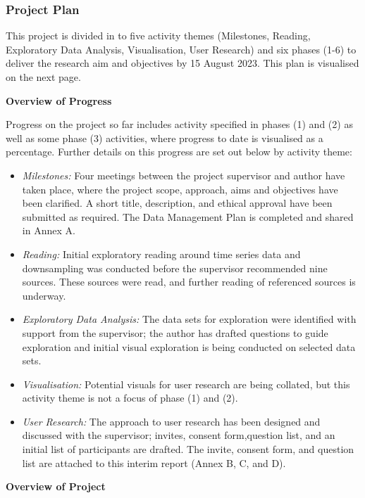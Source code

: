 \documentclass[
]{article}
\begin{document}
\hypertarget{project-plan}{%
\subsubsection{Project Plan}\label{project-plan}}

This project is divided in to five activity themes (Milestones, Reading,
Exploratory Data Analysis, Visualisation, User Research) and six phases
(1-6) to deliver the research aim and objectives by 15 August 2023. This
plan is visualised on the next page.

\textbf{Overview of Progress}

Progress on the project so far includes activity specified in phases (1)
and (2) as well as some phase (3) activities, where progress to date is
visualised as a percentage. Further details on this progress are set out
below by activity theme:

\begin{itemize}
\item
  \emph{Milestones:} Four meetings between the project supervisor and
  author have taken place, where the project scope, approach, aims and
  objectives have been clarified. A short title, description, and
  ethical approval have been submitted as required. The Data Management
  Plan is completed and shared in Annex A.
\item
  \emph{Reading:} Initial exploratory reading around time series data
  and downsampling was conducted before the supervisor recommended nine
  sources. These sources were read, and further reading of referenced
  sources is underway.
\item
  \emph{Exploratory Data Analysis:} The data sets for exploration were
  identified with support from the supervisor; the author has drafted
  questions to guide exploration and initial visual exploration is being
  conducted on selected data sets.
\item
  \emph{Visualisation:} Potential visuals for user research are being
  collated, but this activity theme is not a focus of phase (1) and (2).
\item
  \emph{User Research:} The approach to user research has been designed
  and discussed with the supervisor; invites, consent form,question
  list, and an initial list of participants are drafted. The invite,
  consent form, and question list are attached to this interim report
  (Annex B, C, and D).
\end{itemize}

\textbf{Overview of Project}
\end{document}
